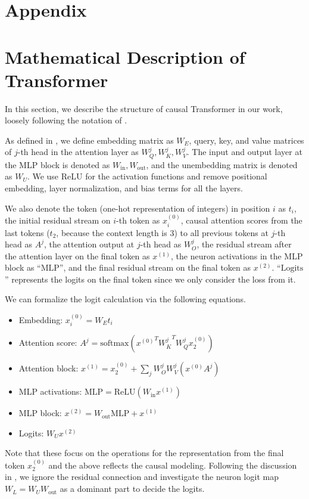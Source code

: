\appendix
\section*{Appendix}

\section{Mathematical Description of Transformer}
\label{appendix:transformer}
In this section, we describe the structure of causal Transformer in our work, loosely following the notation of \citet{elhage2021mathematical}.

As defined in , we define embedding matrix as $W_{E}$, query, key, and value matrices of $j$-th head in the attention layer as $W^{j}_{Q}, W^{j}_{K}, W^{j}_{V}$. The input and output layer at the MLP block is denoted as $W_{\text{in}}, W_{\text{out}}$, and the unembedding matrix is denoted as $W_{U}$.
We use ReLU for the activation functions and remove positional embedding, layer normalization, and bias terms for all the layers.

We also denote the token (one-hot representation of integers) in position $i$ as $t_i$, the initial residual stream on $i$-th token as $x^{(0)}_i$, causal attention scores from the last tokens ($t_2$, because the context length is 3) to all previous tokens at $j$-th head as $A^{j}$, the attention output at $j$-th head as $W_{O}^j$, the residual stream after the attention layer on the final token as $x^{(1)}$, the neuron activations in the MLP block as ``$\text{MLP}$'', and the final residual stream on the final token as $x^{(2)}$.
``$\text{Logits}$'' represents the logits on the final token since we only consider the loss from it.

We can formalize the logit calculation via the following equations.
\begin{itemize}[leftmargin=0.5cm,topsep=0pt,itemsep=0pt]
    \item Embedding: $x^{(0)}_{i} = W_{E}t_i$
    \item Attention score: $A^{j} = \text{softmax}({x^{(0)}}^{T}{W^{j}_{K}}^T W^{j}_{Q} x^{(0)}_{2}) $
    \item Attention block: $x^{(1)} =  x^{(0)}_{2} + \sum_{j} W_{O}^j W_{V}^j (x^{(0)}A^j) $
    \item MLP activations: $\text{MLP} = \text{ReLU}(W_{\text{in}}x^{(1)})$
    \item MLP block: $x^{(2)} = W_{\text{out}}\text{MLP} + x^{(1)}$
    \item Logits: $W_{U}x^{(2)}$
\end{itemize}
Note that these focus on the operations for the representation from the final token $x_{2}^{(0)}$ and the above reflects the causal modeling.
Following the discussion in \citet{nanda2023progress}, we ignore the residual connection and investigate the neuron logit map $W_{L} = W_{U}W_{\text{out}}$ as a dominant part to decide the logits.

